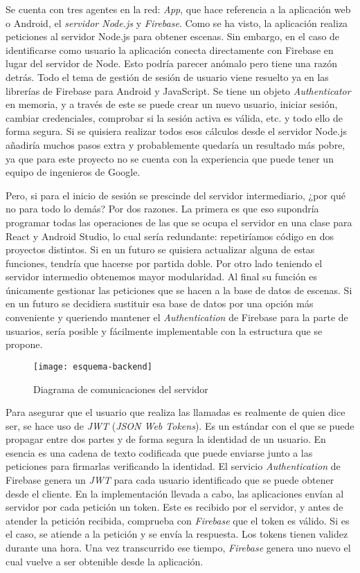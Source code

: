 Se cuenta con tres agentes en la red: \textit{App}, que hace referencia a la aplicación web o Android, el \textit{servidor Node.js} y \textit{Firebase}. Como se ha visto, la aplicación realiza peticiones al servidor Node.js para obtener escenas. Sin embargo, en el caso de identificarse como usuario la aplicación conecta directamente con Firebase en lugar del servidor de Node. Esto podría parecer anómalo pero tiene una razón detrás. Todo el tema de gestión de sesión de usuario viene resuelto ya en las librerías de Firebase para Android y JavaScript. Se tiene un objeto \textit{Authenticator} en memoria, y a través de este se puede crear un nuevo usuario, iniciar sesión, cambiar credenciales, comprobar si la sesión activa es válida, etc. y todo ello de forma segura. Si se quisiera realizar todos esos cálculos desde el servidor Node.js añadiría muchos pasos extra y probablemente quedaría un resultado más pobre, ya que para este proyecto no se cuenta con la experiencia que puede tener un equipo de ingenieros de Google.

Pero, si para el inicio de sesión se prescinde del servidor intermediario, ¿por qué no para todo lo demás? Por dos razones. La primera es que eso supondría programar todas las operaciones de las que se ocupa el servidor en una clase para React y Android Studio, lo cual sería redundante: repetiríamos código en dos proyectos distintos. Si en un futuro se quisiera actualizar alguna de estas funciones, tendría que hacerse por partida doble. Por otro lado teniendo el servidor intermedio obtenemos mayor modularidad. Al final su función es únicamente gestionar las peticiones que se hacen a la base de datos de escenas. Si en un futuro se decidiera sustituir esa base de datos por una opción más conveniente y queriendo mantener el \textit{Authentication} de Firebase para la parte de usuarios, sería posible y fácilmente implementable con la estructura que se propone.

\begin{figure}[h]
    \centering
    \texttt{[image: esquema-backend]}
    \caption[Diagrama de comunicaciones del servidor]{Diagrama de comunicaciones del servidor}
\end{figure}

Para asegurar que el usuario que realiza las llamadas es realmente de quien dice ser, se hace uso de \textit{JWT} (\textit{JSON Web Tokens}). Es un estándar con el que se puede propagar entre dos partes y de forma segura la identidad de un usuario. En esencia es una cadena de texto codificada que puede enviarse junto a las peticiones para firmarlas verificando la identidad. El servicio \textit{Authentication} de Firebase genera un \textit{JWT} para cada usuario identificado que se puede obtener desde el cliente. En la implementación llevada a cabo, las aplicaciones envían al servidor por cada petición un token. Este es recibido por el servidor, y antes de atender la petición recibida, comprueba con \textit{Firebase} que el token es válido. Si es el caso, se atiende a la petición y se envía la respuesta. Los tokens tienen validez durante una hora. Una vez transcurrido ese tiempo, \textit{Firebase} genera uno nuevo el cual vuelve a ser obtenible desde la aplicación.

